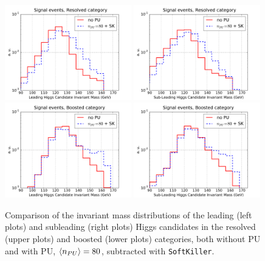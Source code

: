 \begin{figure}[t]
  \begin{center}
      \vspace{-1cm}
      \includegraphics[width=0.49\textwidth]{plots/m_H0_res_comp.pdf}
      \includegraphics[width=0.49\textwidth]{plots/m_H1_res_comp.pdf}
      \includegraphics[width=0.49\textwidth]{plots/m_H0_bst_comp.pdf}
      \includegraphics[width=0.49\textwidth]{plots/m_H1_bst_comp.pdf}
  \caption{\small
    Comparison of the invariant mass distributions of the leading (left plots)
    and subleading (right plots) Higgs candidates in the resolved
    (upper plots) and boosted (lower plots) categories,
    both without PU and with
    PU, $\left\langle n_{PU}\right\rangle=80$, subtracted with {\tt SoftKiller}.
}
\label{fig:m_H_PU}
\end{center}
\end{figure}


